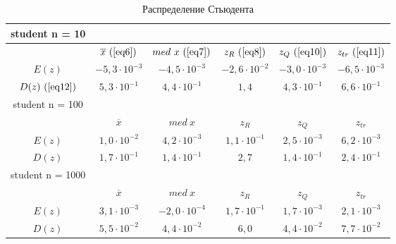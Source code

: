 \begin{table}[H]
    \centering
    \begin{tabular}{ |c|c|c|c|c|c| } 
 \hline
 student n = 10 & & & & & \\ 
 \hline
  &$\overline{x}\ (\ref{eq6})$ & $med\ x\ (\ref{eq7})$ & $z_{R}\ (\ref{eq8})$ & $z_{Q}\ (\ref{eq10})$ & $z_{tr}\ (\ref{eq11})$\\ 
 \hline
 $E(z)$ & $-5,3 \cdot 10^{-3}$ & $-4,5 \cdot 10^{-3}$ & $-2,6 \cdot 10^{-2}$ & $-3,0 \cdot 10^{-3}$ & $-6,5 \cdot 10^{-3}$ \\ 
 \hline
 $D(z)\ (\ref{eq12})$ & $5,3 \cdot 10^{-1}$ & $4,4 \cdot 10^{-1}$ & $1,4$ & $4,3 \cdot 10^{-1}$ & $6,6 \cdot 10^{-1}$ \\ 
 \hline\hline
 student n = 100 & & & & & \\
 \hline
 &$\overline{x}$ & $med\ x$ & $z_{R}$ & $z_{Q}$ & $z_{tr}$\\ 
 \hline
 $E(z)$ & $1,0 \cdot 10^{-2}$ & $4,2 \cdot 10^{-3}$ & $1,1 \cdot 10^{-1}$ & $2,5 \cdot 10^{-3}$ & $6,2 \cdot 10^{-3}$ \\ 
 \hline
 $D(z)$ & $1,7 \cdot 10^{-1}$ & $1,4 \cdot 10^{-1}$ & $2,7$ & $1,4 \cdot 10^{-1}$ & $2,4 \cdot 10^{-1}$ \\ 
 \hline\hline
 student n = 1000 & & & & & \\
 \hline
 &$\overline{x}$ & $med\ x$ & $z_{R}$ & $z_{Q}$ & $z_{tr}$\\ 
 \hline
 $E(z)$ & $3,1 \cdot 10^{-3}$ & $-2,0 \cdot 10^{-4}$ & $1,7 \cdot 10^{-1}$ & $1,7 \cdot 10^{-3}$ & $2,1 \cdot 10^{-3}$ \\ 
 \hline
 $D(z)$ & $5,5 \cdot 10^{-2}$ & $4,4 \cdot 10^{-2}$ & $6,0$ & $4,4 \cdot 10^{-2}$ & $7,7 \cdot 10^{-2}$ \\
 \hline
\end{tabular}
    \caption{Распределение Стьюдента}
    \label{table:3}
\end{table}


